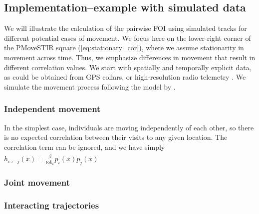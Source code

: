 \documentclass[letterpaper]{article}
\begin{document}
\subsection*{Implementation--example with simulated data}

We will illustrate the calculation of the pairwise FOI using simulated tracks for different potential cases of movement. We focus here on the lower-right corner of the PMoveSTIR square (\ref{eq:stationary_cor}), where we assume stationarity in movement across time. Thus, we emphasize differences in movement that result in different correlation values. We start with spatially and temporally explicit data, as could be obtained from GPS collars, or high-resolution radio telemetry \citep{Aspillaga2021}. We simulate the movement process following the model by \citet{Hooten2017}. 

\subsubsection{Independent movement}

In the simplest case, individuals are moving independently of each other, so there is no expected correlation between their visits to any given location. The correlation term can be ignored, and we have simply 
$h_{i\leftarrow j}(x)=\frac{\tilde\beta}{\nu A_x} p_i(x)p_j(x)$


\subsubsection{Joint movement}

\subsubsection{Interacting trajectories}
 



\end{document}
